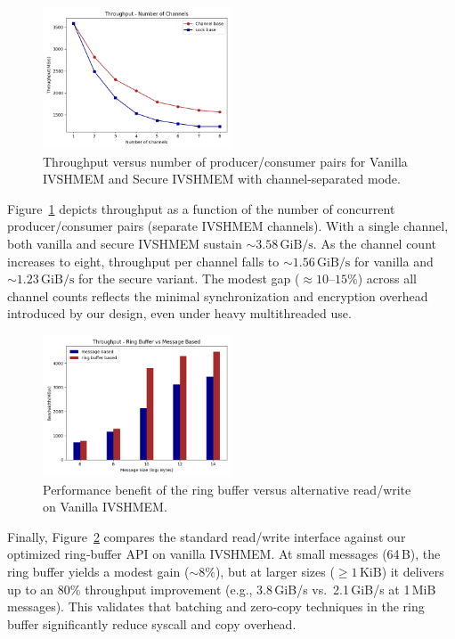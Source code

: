 \documentclass[conference]{IEEEtran}
\begin{document}
\begin{figure}[!h]
  \centering
  \includegraphics[width=0.5\textwidth]{figures/mpmc.png}
  \caption{Throughput versus number of producer/consumer pairs for Vanilla IVSHMEM and Secure IVSHMEM with channel-separated mode.}
  \label{fig:perf_mpmc}
\end{figure}

Figure~\ref{fig:perf_mpmc} depicts throughput as a function of the number of
concurrent producer/consumer pairs (separate IVSHMEM channels). With a single
channel, both vanilla and secure IVSHMEM sustain
\(\sim3.58\,\mathrm{GiB}/\mathrm{s}\). As the channel count increases to eight,
throughput per channel falls to \(\sim1.56\,\mathrm{GiB}/\mathrm{s}\) for
vanilla and \(\sim1.23\,\mathrm{GiB}/\mathrm{s}\) for the secure variant. The
modest gap (\(\approx10\)–\(15\%\)) across all channel counts reflects the
minimal synchronization and encryption overhead introduced by our design, even
under heavy multithreaded use.

\begin{figure}[!h]
  \centering
  \includegraphics[width=0.5\textwidth]{figures/ring_buffer.png}
  \caption{Performance benefit of the ring buffer versus alternative read/write on Vanilla IVSHMEM.}
  \label{fig:perf_ring_buffer}
\end{figure}

Finally, Figure~\ref{fig:perf_ring_buffer} compares the standard read/write
interface against our optimized ring‐buffer API on vanilla IVSHMEM. At small
messages (64\,B), the ring buffer yields a modest gain (\(\sim8\%\)), but at
larger sizes (\(\geq1\,\mathrm{KiB}\)) it delivers up to an \(80\%\) throughput
improvement (e.g., 3.8\,GiB/s vs.\ 2.1\,GiB/s at 1\,MiB messages). This
validates that batching and zero‐copy techniques in the ring buffer
significantly reduce syscall and copy overhead.
\end{document}
